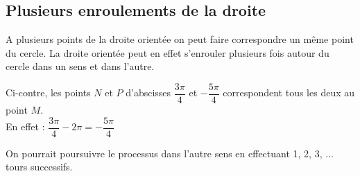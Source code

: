     \subsection{Plusieurs enroulements de la droite}
        \begin{minipage}{0.55\linewidth}
            A plusieurs points de la droite orientée on peut faire correspondre un même point du cercle. La droite orientée peut en effet s'enrouler plusieurs fois autour du cercle dans un sens et dans l'autre.\\
            \begin{bexemples}
            \begin{itemEx}
                \item Ci-contre, les points $N$ et $P$ d'abscisses $\dfrac{3\pi}{4}$ et $-\dfrac{5\pi}{4}$ correspondent tous les deux au point $M$.\\ 
                En effet : $\dfrac{3\pi}{4} -2\pi= -\dfrac{5\pi}{4}$
                \item On pourrait poursuivre le processus dans l'autre sens en effectuant 1, 2, 3, ... tours successifs.\\ 
            \end{itemEx}
        \end{bexemples}
        \end{minipage} \hfill
